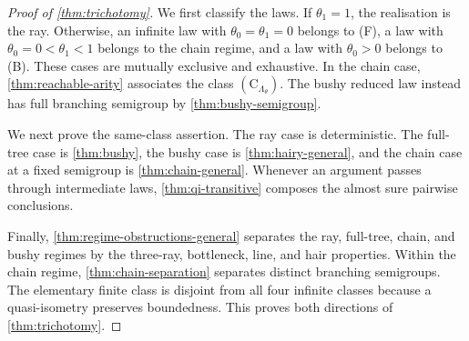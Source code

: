\begin{proof}[Proof of \cref{thm:trichotomy}]
\leanok
{}
We first classify the laws. If $\theta_1=1$, the realisation is the ray. Otherwise, an infinite
law with $\theta_0=\theta_1=0$ belongs to (F), a law with $\theta_0=0<\theta_1<1$ belongs to
the chain regime, and a law with $\theta_0>0$ belongs to (B). These cases are mutually exclusive
and exhaustive. In the chain case, \cref{thm:reachable-arity} associates the class
$(\mathrm C_{\Lambda_\theta})$. The bushy reduced law instead has full branching semigroup by
\cref{thm:bushy-semigroup}.

We next prove the same-class assertion. The ray case is deterministic. The full-tree case is
\cref{thm:bushy}, the bushy case is \cref{thm:hairy-general}, and the chain case at a fixed
semigroup is \cref{thm:chain-general}. Whenever an argument passes through intermediate laws,
\cref{thm:qi-transitive} composes the almost sure pairwise conclusions.

Finally, \cref{thm:regime-obstructions-general} separates the ray, full-tree, chain, and bushy
regimes by the three-ray, bottleneck, line, and hair properties. Within the chain regime,
\cref{thm:chain-separation} separates distinct branching semigroups. The elementary finite class
is disjoint from all four infinite classes because a quasi-isometry preserves boundedness. This
proves both directions of \cref{thm:trichotomy}.
\end{proof}
